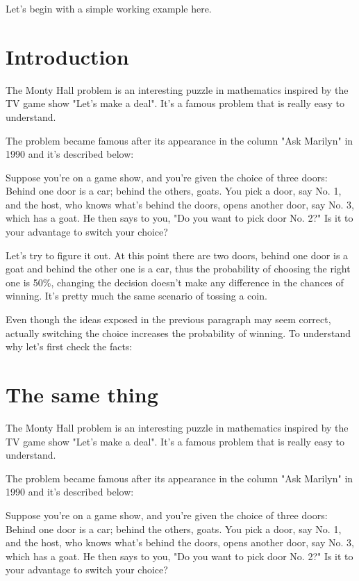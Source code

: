 \documentclass{exampleclass}
\begin{document}
Let's begin with a simple working example here.


\section{Introduction}

The Monty Hall problem is an interesting puzzle in mathematics inspired by the TV 
game show "Let's make a deal". It's a famous problem that is really easy to understand.

The problem became famous after its appearance in the column "Ask Marilyn" in 1990 and 
it's described below:

Suppose you're on a game show, and you're given the choice of three doors: Behind one 
door is a car; behind the others, goats. You pick a door, say No. 1, and the host, who 
knows what's behind the doors, opens another door, say No. 3, which has a goat. He then 
says to you, "Do you want to pick door No. 2?" Is it to your advantage to switch your
choice?


Let's try to figure it out. At this point there are two doors, behind one door is a goat 
and behind the other one is a car, thus the probability of choosing the right one is 50\%,
changing the decision doesn't make any difference in the chances of winning. It's pretty
much the same scenario of tossing a coin.

Even though the ideas exposed in the previous paragraph may seem correct, actually 
switching the choice increases the probability of winning. To understand why let's 
first check the facts:

\section{The same thing}

The Monty Hall problem is an interesting puzzle in mathematics inspired by the TV 
game show "Let's make a deal". It's a famous problem that is really easy to understand.

The problem became famous after its appearance in the column "Ask Marilyn" in 1990 and 
it's described below:

Suppose you're on a game show, and you're given the choice of three doors: Behind one 
door is a car; behind the others, goats. You pick a door, say No. 1, and the host, who 
knows what's behind the doors, opens another door, say No. 3, which has a goat. He then 
says to you, "Do you want to pick door No. 2?" Is it to your advantage to switch your
choice?
\end{document}
